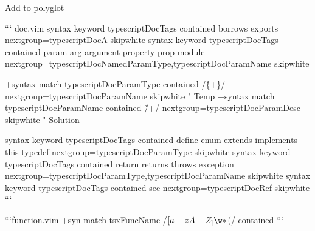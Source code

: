 Add to polyglot

``` doc.vim
 syntax keyword typescriptDocTags               contained borrows exports nextgroup=typescriptDocA skipwhite
 syntax keyword typescriptDocTags               contained param arg argument property prop module nextgroup=typescriptDocNamedParamType,typescriptDocParamName skipwhite

+syntax match typescriptDocParamType contained /\v\{\w+\}/ nextgroup=typescriptDocParamName skipwhite " Temp
+syntax match typescriptDocParamName contained /\v\w+/ nextgroup=typescriptDocParamDesc skipwhite " Solution

 syntax keyword typescriptDocTags               contained define enum extends implements this typedef nextgroup=typescriptDocParamType skipwhite
 syntax keyword typescriptDocTags               contained return returns throws exception nextgroup=typescriptDocParamType,typescriptDocParamName skipwhite
 syntax keyword typescriptDocTags               contained see nextgroup=typescriptDocRef skipwhite
```
                                                                                                                  
```function.vim
+syn match tsxFuncName /\b\([a-zA-Z_]\w*\)\s*(/ contained
```

